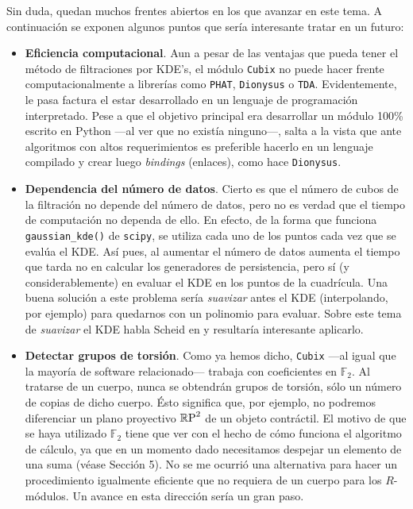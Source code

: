 \documentclass[12pt,a4paper,twoside]{article} %
\theoremstyle{plain}
\theoremstyle{definition}
\newcommand{\F}{\mathbb{F}}
\newcommand{\RP}{\mathbb{R}\textup{P}}
\begin{document}
Sin duda, quedan muchos frentes abiertos en los que avanzar en este tema. A continuación se exponen algunos puntos que sería interesante tratar en un futuro:
\begin{itemize}
\item \textbf{Eficiencia computacional}. Aun a pesar de las ventajas que pueda tener el método de filtraciones por KDE's, el módulo \texttt{Cubix} no puede hacer frente computacionalmente a librerías como \texttt{PHAT}, \texttt{Dionysus} o \texttt{TDA}. Evidentemente, le pasa factura el estar desarrollado en un lenguaje de programación interpretado. Pese a que el objetivo principal era desarrollar un módulo 100\% escrito en Python ---al ver que no existía ninguno---, salta a la vista que ante algoritmos con altos requerimientos es preferible hacerlo en un lenguaje compilado y crear luego \emph{bindings} (enlaces), como hace \texttt{Dionysus}.

\item \textbf{Dependencia del número de datos}. Cierto es que el número de cubos de la filtración no depende del número de datos, pero no es verdad que el tiempo de computación no dependa de ello. En efecto, de la forma que funciona \texttt{gaussian\_kde()} de \texttt{scipy}, se utiliza cada uno de los puntos cada vez que se evalúa el KDE. Así pues, al aumentar el número de datos aumenta el tiempo que tarda no en calcular los generadores de persistencia, pero sí (y considerablemente) en evaluar el KDE en los puntos de la cuadrícula. Una buena solución a este problema sería \emph{suavizar} antes el KDE (interpolando, por ejemplo) para quedarnos con un polinomio para evaluar. Sobre este tema de \emph{suavizar} el KDE habla Scheid en \cite{Scheid} y resultaría interesante aplicarlo.

\item \textbf{Detectar grupos de torsión}. Como ya hemos dicho, \texttt{Cubix} ---al igual que la mayoría de software relacionado--- trabaja con coeficientes en $\F_2$. Al tratarse de un cuerpo, nunca se obtendrán grupos de torsión, sólo un número de copias de dicho cuerpo. Ésto significa que, por ejemplo, no podremos diferenciar un plano proyectivo $\RP^2$ de un objeto contráctil. El motivo de que se haya utilizado $\F_2$ tiene que ver con el hecho de cómo funciona el algoritmo de cálculo, ya que en un momento dado necesitamos despejar un elemento de una suma (véase Sección 5). No se me ocurrió una alternativa para hacer un procedimiento igualmente eficiente que no requiera de un cuerpo para los $R$-módulos. Un avance en esta dirección sería un gran paso.


\end{itemize}
\end{document}

